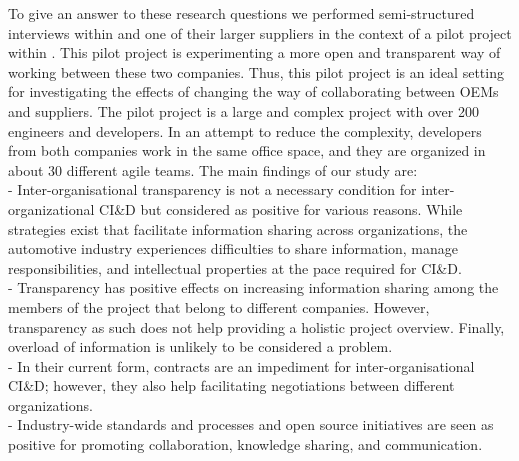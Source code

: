 To give an answer to these research questions we performed semi-structured interviews within \company{} %
and 
one of their larger suppliers in the context of a pilot project within \company{}. %
This pilot project is experimenting a more open and transparent way of working between these two companies. Thus, this pilot project is an ideal setting for investigating the effects of changing the way of collaborating between OEMs and suppliers.  
The pilot project is a large and complex project with over 200 engineers and developers. 
In an attempt to reduce the complexity, developers from both companies work in the same office space, and they are organized in about 30 different agile teams. %
The main findings of our study are:\\
{} - Inter-organisational transparency is not a necessary condition for inter-organizational CI\&D but considered as positive for various reasons. %
While strategies exist that facilitate information sharing  across organizations, the automotive industry experiences difficulties to share information, manage responsibilities, and intellectual properties at the pace required for CI\&D.\\ %
{} - Transparency has positive effects on increasing information sharing among the members of the project that belong to different companies. However, transparency as such does not help providing a holistic project overview. Finally, overload of information is unlikely to be considered a problem.\\
{} - In their current form, contracts are an impediment for inter-or\-ga\-nisational CI\&D; however, they also help facilitating negotiations between different organizations. \\
{} - Industry-wide standards and processes and open source initiatives are seen as positive for promoting collaboration, knowledge sharing, and communication.

